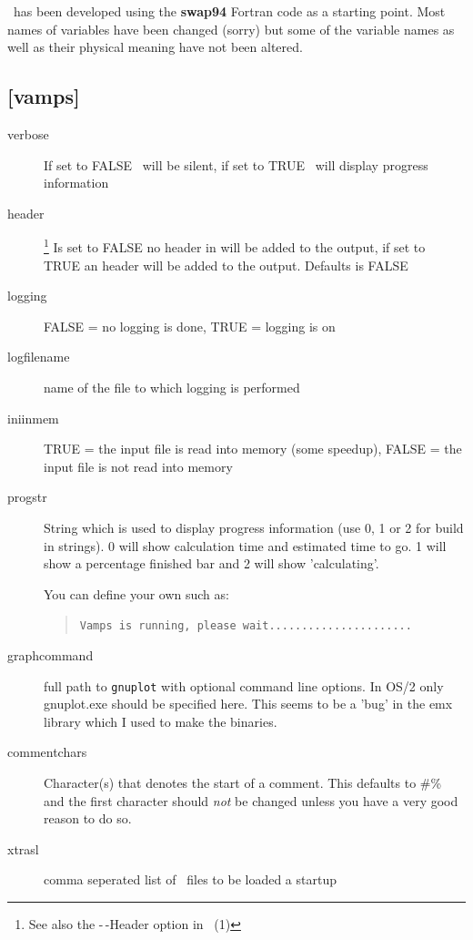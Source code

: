 \vamps\ has been developed using the {\bf swap94} {\sc Fortran} code as a 
starting point.  Most names of variables have been changed (sorry) but
some of the variable names as well  as their physical meaning have not
been altered.


\subsection{[vamps]}\label{section:defaults}
\begin{description}
\item[verbose] If set to FALSE \vamps\ will be  silent, if set to
TRUE \vamps\ will display progress information

\item[header]\footnote{See also the -\,-Header option in \vamps\ (1)}
Is set to FALSE  no header in will be added to the output, if
set to TRUE an  header will be added to the output. Defaults is FALSE

\item[logging] FALSE = no logging is done, TRUE = logging is on

\item[logfilename] name of the file to which logging is performed

\item[iniinmem]
TRUE = the input file is read into memory (some speedup), FALSE = the
input file is not read into memory

\item[progstr]
String which is used to display progress information (use 0, 1 or 2
for build in strings).  0 will show calculation time and estimated
time to go. 1 will show a percentage finished bar and 2 will show
'calculating'.

You can define your own such as:
\begin{quote}
{\tt Vamps is running, please wait......................}
\end{quote}


\item[graphcommand] full path to {\tt gnuplot}
with optional command line options. In OS/2 only gnuplot.exe should be
specified here. This seems to be a 'bug' in the emx library which I used
to make the binaries.

\item[commentchars]
Character(s) that denotes the start of a comment. This defaults to \#\%
and the first character should {\em not} be changed unless you have a
very good reason to do so.

\item[xtrasl]
comma seperated  list of \slang\ files to be loaded a startup
\end{description}


